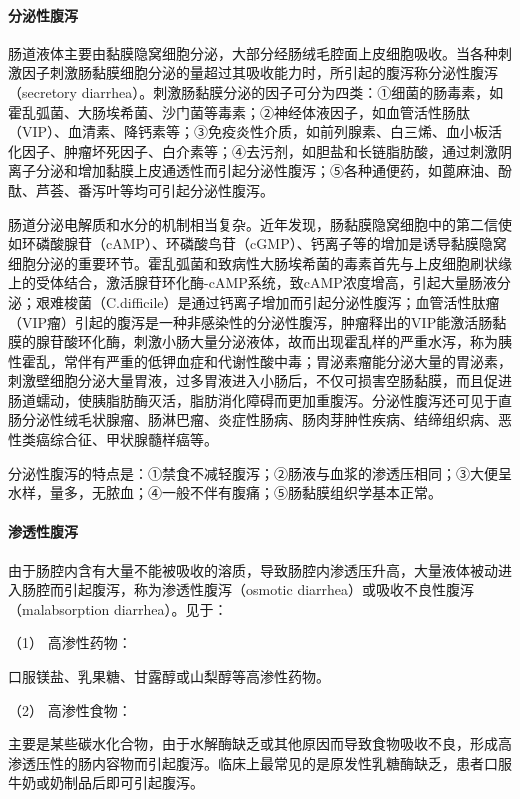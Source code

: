 \paragraph{分泌性腹泻}

肠道液体主要由黏膜隐窝细胞分泌，大部分经肠绒毛腔面上皮细胞吸收。当各种刺激因子刺激肠黏膜细胞分泌的量超过其吸收能力时，所引起的腹泻称分泌性腹泻（secretory
diarrhea）。刺激肠黏膜分泌的因子可分为四类：①细菌的肠毒素，如霍乱弧菌、大肠埃希菌、沙门菌等毒素；②神经体液因子，如血管活性肠肽（VIP）、血清素、降钙素等；③免疫炎性介质，如前列腺素、白三烯、血小板活化因子、肿瘤坏死因子、白介素等；④去污剂，如胆盐和长链脂肪酸，通过刺激阴离子分泌和增加黏膜上皮通透性而引起分泌性腹泻；⑤各种通便药，如蓖麻油、酚酞、芦荟、番泻叶等均可引起分泌性腹泻。

肠道分泌电解质和水分的机制相当复杂。近年发现，肠黏膜隐窝细胞中的第二信使如环磷酸腺苷（cAMP）、环磷酸鸟苷（cGMP）、钙离子等的增加是诱导黏膜隐窝细胞分泌的重要环节。霍乱弧菌和致病性大肠埃希菌的毒素首先与上皮细胞刷状缘上的受体结合，激活腺苷环化酶-cAMP系统，致cAMP浓度增高，引起大量肠液分泌；艰难梭菌（C.difficile）是通过钙离子增加而引起分泌性腹泻；血管活性肽瘤（VIP瘤）引起的腹泻是一种非感染性的分泌性腹泻，肿瘤释出的VIP能激活肠黏膜的腺苷酸环化酶，刺激小肠大量分泌液体，故而出现霍乱样的严重水泻，称为胰性霍乱，常伴有严重的低钾血症和代谢性酸中毒；胃泌素瘤能分泌大量的胃泌素，刺激壁细胞分泌大量胃液，过多胃液进入小肠后，不仅可损害空肠黏膜，而且促进肠道蠕动，使胰脂肪酶灭活，脂肪消化障碍而更加重腹泻。分泌性腹泻还可见于直肠分泌性绒毛状腺瘤、肠淋巴瘤、炎症性肠病、肠肉芽肿性疾病、结缔组织病、恶性类癌综合征、甲状腺髓样癌等。

分泌性腹泻的特点是：①禁食不减轻腹泻；②肠液与血浆的渗透压相同；③大便呈水样，量多，无脓血；④一般不伴有腹痛；⑤肠黏膜组织学基本正常。

\paragraph{渗透性腹泻}

由于肠腔内含有大量不能被吸收的溶质，导致肠腔内渗透压升高，大量液体被动进入肠腔而引起腹泻，称为渗透性腹泻（osmotic
diarrhea）或吸收不良性腹泻（malabsorption diarrhea）。见于：

\hypertarget{text00030.htmlux5cux23CHP1-12-1-2-1}{}
（1） 高渗性药物：

口服镁盐、乳果糖、甘露醇或山梨醇等高渗性药物。

\hypertarget{text00030.htmlux5cux23CHP1-12-1-2-2}{}
（2） 高渗性食物：

主要是某些碳水化合物，由于水解酶缺乏或其他原因而导致食物吸收不良，形成高渗透压性的肠内容物而引起腹泻。临床上最常见的是原发性乳糖酶缺乏，患者口服牛奶或奶制品后即可引起腹泻。

